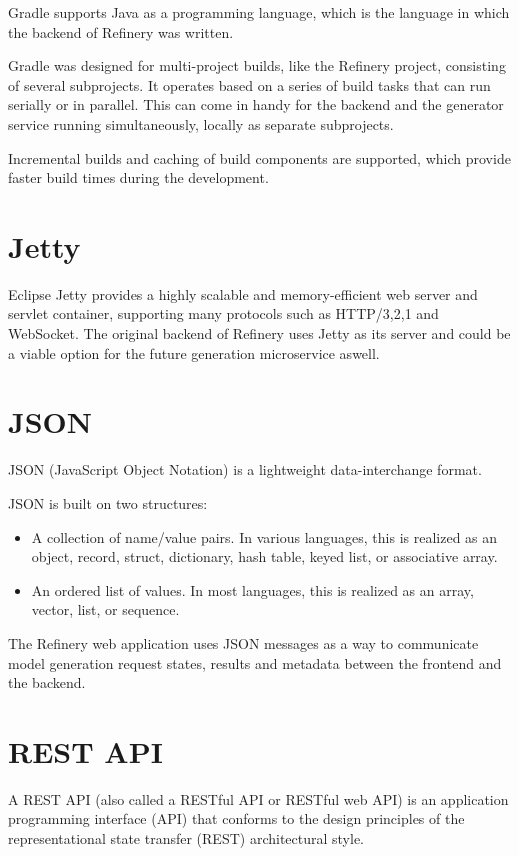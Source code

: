 	Gradle supports Java as a programming language, which is the language in which the backend of Refinery was written.

	Gradle was designed for multi-project builds, like the Refinery project, consisting of several subprojects. 
	It operates based on a series of build tasks that can run serially or in parallel. This can come in handy for the backend and the generator service 
	running simultaneously, locally as separate subprojects.

	Incremental builds and caching of build components are supported, which provide faster build times during the development.

\section{Jetty}
	Eclipse Jetty \cite{jetty} provides a highly scalable and memory-efficient web server and servlet container, supporting many protocols
	 such as HTTP/3,2,1 and WebSocket. The original backend of Refinery uses Jetty as its server and could be a viable option for the future generation
	 microservice aswell.

\section{JSON}
	JSON (JavaScript Object Notation) \cite{json} is a lightweight data-interchange format. 

	JSON is built on two structures:
	\begin{itemize}
		\item A collection of name/value pairs. In various languages, this is realized as an object, record, struct, dictionary, hash table, 
		keyed list, or associative array.
		\item An ordered list of values. In most languages, this is realized as an array, vector, list, or sequence.
	\end{itemize}

	The Refinery web application uses JSON messages as a way to communicate model generation request states, results and metadata between the frontend and the backend.


\section{REST API}
	A REST API \cite{restapi} (also called a RESTful API or RESTful web API) is an application programming interface (API) that conforms to the design principles of 
	the representational state transfer (REST) architectural style. 

